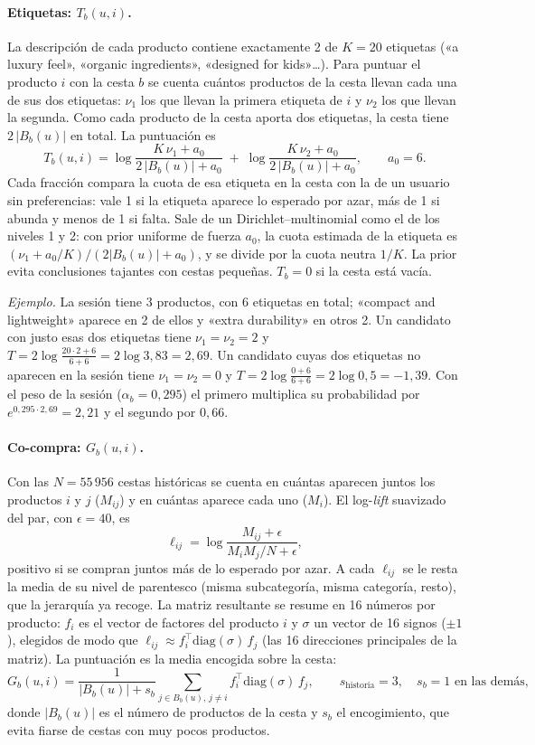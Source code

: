 \documentclass[11pt,a4paper]{article}
\begin{document}
\paragraph{Etiquetas: $T_b(u,i)$.} La descripción de cada producto contiene exactamente 2 de $K=20$
etiquetas («a luxury feel», «organic ingredients», «designed for kids»\dots). Para puntuar el producto
$i$ con la cesta $b$ se cuenta cuántos productos de la cesta llevan cada una de sus dos etiquetas:
$\nu_1$ los que llevan la primera etiqueta de $i$ y $\nu_2$ los que llevan la segunda. Como cada producto
de la cesta aporta dos etiquetas, la cesta tiene $2\,|B_b(u)|$ en total. La puntuación es
\[
T_b(u,i)=\log\frac{K\,\nu_1+a_0}{2\,|B_b(u)|+a_0}\;+\;\log\frac{K\,\nu_2+a_0}{2\,|B_b(u)|+a_0},
\qquad a_0=6 .
\]
Cada fracción compara la cuota de esa etiqueta en la cesta con la de un usuario sin preferencias: vale
1 si la etiqueta aparece lo esperado por azar, más de 1 si abunda y menos de 1 si falta. Sale de un
Dirichlet--multinomial como el de los niveles 1 y 2: con prior uniforme de fuerza $a_0$, la cuota
estimada de la etiqueta es $(\nu_1+a_0/K)/(2|B_b(u)|+a_0)$, y se divide por la cuota neutra $1/K$. La
prior evita conclusiones tajantes con cestas pequeñas. $T_b=0$ si la cesta está vacía.

\emph{Ejemplo.} La sesión tiene 3 productos, con 6 etiquetas en total; «compact and lightweight» aparece
en 2 de ellos y «extra durability» en otros 2. Un candidato con justo esas dos etiquetas tiene
$\nu_1=\nu_2=2$ y
$T=2\log\frac{20\cdot2+6}{6+6}=2\log 3{,}83=2{,}69$. Un candidato cuyas dos etiquetas no aparecen en
la sesión tiene $\nu_1=\nu_2=0$ y $T=2\log\frac{0+6}{6+6}=2\log 0{,}5=-1{,}39$. Con el peso de
la sesión ($\alpha_b=0{,}295$) el primero multiplica su probabilidad por $e^{0{,}295\cdot2{,}69}=2{,}21$ y el
segundo por $0{,}66$.

\paragraph{Co-compra: $G_b(u,i)$.} Con las $N=55\,956$ cestas históricas se cuenta en cuántas aparecen
juntos los productos $i$ y $j$ ($M_{ij}$) y en cuántas aparece cada uno ($M_i$). El log-\emph{lift}
suavizado del par, con $\epsilon=40$, es
\[
\ell_{ij}=\log\frac{M_{ij}+\epsilon}{M_iM_j/N+\epsilon},
\]
positivo si se compran juntos más de lo esperado por azar. A cada $\ell_{ij}$ se le resta la media de su
nivel de parentesco (misma subcategoría, misma categoría, resto), que la jerarquía ya recoge. La matriz
resultante se resume en 16 números por producto: $f_i$ es el vector de factores del producto $i$ y
$\sigma$ un vector de 16 signos ($\pm1$), elegidos de modo que
$\ell_{ij}\approx f_i^{\top}\mathrm{diag}(\sigma)\,f_j$ (las 16 direcciones principales de la matriz). La
puntuación es la media encogida sobre la cesta:
\[
G_b(u,i)=\frac{1}{|B_b(u)|+s_b}\sum_{j\in B_b(u),\,j\neq i} f_i^{\top}\mathrm{diag}(\sigma)\,f_j ,
\qquad s_{\text{historia}}=3,\quad s_b=1\text{ en las demás},
\]
donde $|B_b(u)|$ es el número de productos de la cesta y $s_b$ el encogimiento, que evita fiarse de
cestas con muy pocos productos.
\end{document}
